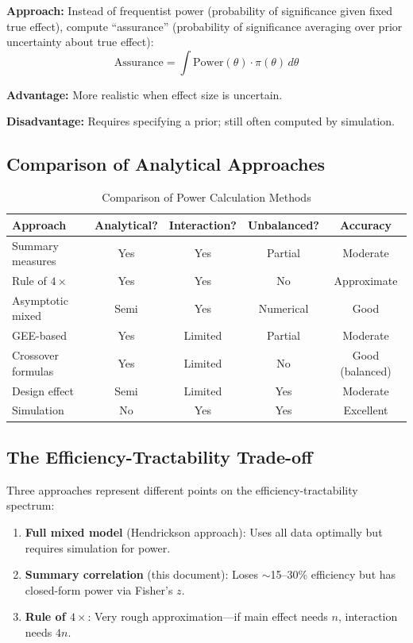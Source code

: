 \documentclass[11pt]{article}
\theoremstyle{definition}
\begin{document}
\textbf{Approach:} Instead of frequentist power (probability of significance
given fixed true effect), compute ``assurance'' (probability of significance
averaging over prior uncertainty about true effect):
\begin{equation}
\text{Assurance} = \int \text{Power}(\theta) \cdot \pi(\theta) \, d\theta
\end{equation}

\textbf{Advantage:} More realistic when effect size is uncertain.

\textbf{Disadvantage:} Requires specifying a prior; still often computed by
simulation.

\subsection{Comparison of Analytical Approaches}

\begin{table}[h]
\centering
\caption{Comparison of Power Calculation Methods}
\begin{tabular}{@{}lcccc@{}}
\toprule
\textbf{Approach} & \textbf{Analytical?} & \textbf{Interaction?} &
\textbf{Unbalanced?} & \textbf{Accuracy} \\
\midrule
Summary measures & Yes & Yes & Partial & Moderate \\
Rule of $4\times$ & Yes & Yes & No & Approximate \\
Asymptotic mixed & Semi & Yes & Numerical & Good \\
GEE-based & Yes & Limited & Partial & Moderate \\
Crossover formulas & Yes & Limited & No & Good (balanced) \\
Design effect & Semi & Limited & Yes & Moderate \\
Simulation & No & Yes & Yes & Excellent \\
\bottomrule
\end{tabular}
\end{table}

\subsection{The Efficiency-Tractability Trade-off}

Three approaches represent different points on the efficiency-tractability
spectrum:

\begin{enumerate}
    \item \textbf{Full mixed model} (Hendrickson approach): Uses all data optimally
    but requires simulation for power.

    \item \textbf{Summary correlation} (this document): Loses $\sim$15--30\%
    efficiency but has closed-form power via Fisher's $z$.

    \item \textbf{Rule of $4\times$}: Very rough approximation---if main effect
    needs $n$, interaction needs $4n$.
\end{enumerate}
\end{document}
